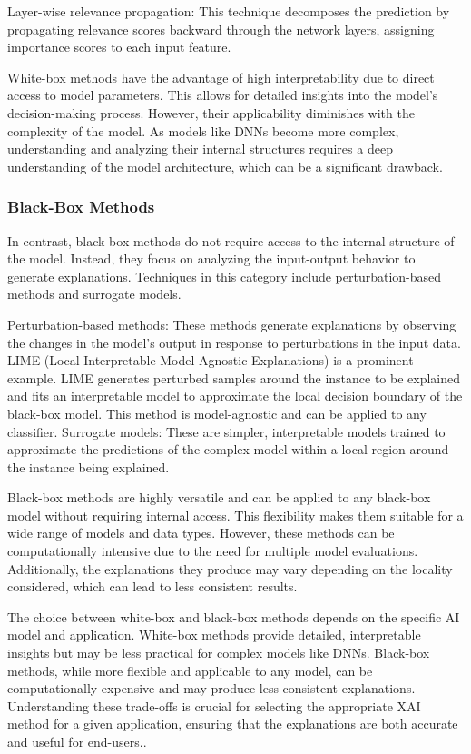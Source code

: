 \documentclass{article}
\begin{document}
Layer-wise relevance propagation: This technique decomposes the prediction by propagating relevance scores backward through the network layers, assigning importance scores to each input feature.

White-box methods have the advantage of high interpretability due to direct access to model parameters. This allows for detailed insights into the model’s decision-making process. However, their applicability diminishes with the complexity of the model. As models like DNNs become more complex, understanding and analyzing their internal structures requires a deep understanding of the model architecture, which can be a significant drawback.

\subsubsection{Black-Box Methods}
In contrast, black-box methods do not require access to the internal structure of the model. Instead, they focus on analyzing the input-output behavior to generate explanations. Techniques in this category include perturbation-based methods and surrogate models.

Perturbation-based methods: These methods generate explanations by observing the changes in the model’s output in response to perturbations in the input data. LIME (Local Interpretable Model-Agnostic Explanations) is a prominent example. LIME generates perturbed samples around the instance to be explained and fits an interpretable model to approximate the local decision boundary of the black-box model. This method is model-agnostic and can be applied to any classifier.
Surrogate models: These are simpler, interpretable models trained to approximate the predictions of the complex model within a local region around the instance being explained.

Black-box methods are highly versatile and can be applied to any black-box model without requiring internal access. This flexibility makes them suitable for a wide range of models and data types. However, these methods can be computationally intensive due to the need for multiple model evaluations. Additionally, the explanations they produce may vary depending on the locality considered, which can lead to less consistent results.

The choice between white-box and black-box methods depends on the specific AI model and application. White-box methods provide detailed, interpretable insights but may be less practical for complex models like DNNs. Black-box methods, while more flexible and applicable to any model, can be computationally expensive and may produce less consistent explanations. Understanding these trade-offs is crucial for selecting the appropriate XAI method for a given application, ensuring that the explanations are both accurate and useful for end-users..
\end{document}
